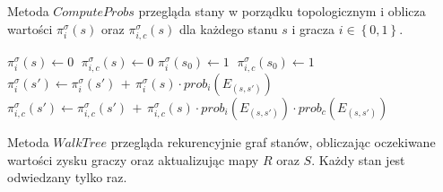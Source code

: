 \documentclass[licencjacka]{pracamgr}
\begin{document}
\noindent
Metoda $ComputeProbs$ przegląda stany w porządku topologicznym i oblicza wartości $\pi_i^{\sigma}(s)$ oraz $\pi_{i, c}^{\sigma}(s)$
dla każdego stanu $s$ i gracza $i \in \left\{0, 1\right\}$. \\ 

\begin{algorithmic}
        \State $\pi_i^{\sigma}(s) \gets 0$ $ \; \pi_{i,c}^{\sigma}(s) \gets 0$
        \State $\pi_i^{\sigma}(s_0) \gets 1$ $ \; \pi_{i,c}^{\sigma}(s_0) \gets 1$
                \State $\pi_i^{\sigma}(s') \gets \pi_i^{\sigma}(s') \, + \, \pi_i^{\sigma}(s) \cdot prob_i(E_{(s, s')})$ 
                \State $\pi_{i,c}^{\sigma}(s') \gets \pi_{i,c}^{\sigma}(s') \, + \, \pi_{i,c}^{\sigma}(s) \cdot prob_i(E_{(s, s')}) \cdot prob_c(E_{(s, s')})$ 
            \EndFor
        \EndFor
    \EndFunction
\end{algorithmic}

$\,$ \\

\noindent
Metoda $WalkTree$ przegląda rekurencyjnie graf stanów, obliczając oczekiwane wartości zysku graczy oraz
aktualizując mapy $R$ oraz $S$. Każdy stan jest odwiedzany tylko raz. \\
\end{document}
